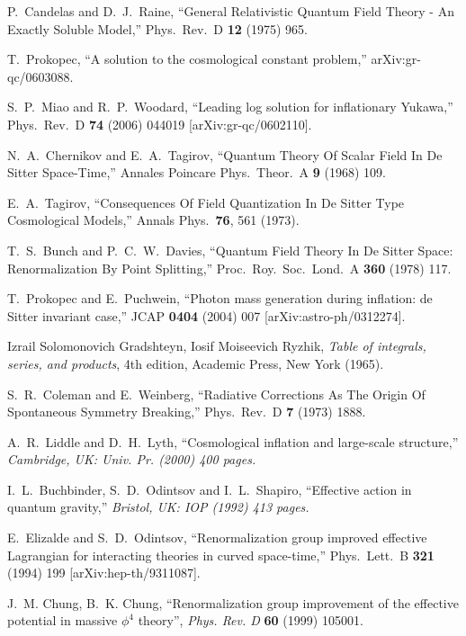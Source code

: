 \documentclass[aps,12pt,superscriptaddress,preprintnumbers,
                secnumarabic,nofootinbib,showpacs]{revtex4}
\begin{document}
\begin{thebibliography}{999}
  P.~Candelas and D.~J.~Raine,
  ``General Relativistic Quantum Field Theory - An Exactly Soluble Model,''
  Phys.\ Rev.\ D {\bf 12} (1975) 965.

  T.~Prokopec,
  ``A solution to the cosmological constant problem,''
  arXiv:gr-qc/0603088.

  S.~P.~Miao and R.~P.~Woodard,
  ``Leading log solution for inflationary Yukawa,''
  Phys.\ Rev.\  D {\bf 74} (2006) 044019
  [arXiv:gr-qc/0602110].

 N.~A.~Chernikov and E.~A.~Tagirov,
``Quantum Theory Of Scalar Field In De Sitter Space-Time,''
Annales Poincare Phys.\ Theor.\ A {\bf 9} (1968) 109.

E.~A.~Tagirov, ``Consequences Of Field Quantization In De Sitter
Type Cosmological Models,'' Annals Phys.\  {\bf 76}, 561 (1973).

T.~S.~Bunch and P.~C.~W.~Davies, ``Quantum Field Theory In De
Sitter Space: Renormalization By Point Splitting,'' Proc.\ Roy.\
Soc.\ Lond.\ A {\bf 360} (1978) 117.

  T.~Prokopec and E.~Puchwein,
  ``Photon mass generation during inflation: de Sitter invariant case,''
  JCAP {\bf 0404} (2004) 007
  [arXiv:astro-ph/0312274].

Izrail Solomonovich Gradshteyn, Iosif Moiseevich Ryzhik,
{\it Table of integrals, series, and products}, 4th edition,
Academic Press, New York (1965).

 S.~R.~Coleman and E.~Weinberg,
``Radiative Corrections As The Origin Of Spontaneous Symmetry
Breaking,'' Phys.\ Rev.\ D {\bf 7} (1973) 1888.

  A.~R.~Liddle and D.~H.~Lyth,
  ``Cosmological inflation and large-scale structure,''
{\it  Cambridge, UK: Univ. Pr. (2000) 400 pages.}

  I.~L.~Buchbinder, S.~D.~Odintsov and I.~L.~Shapiro,
  ``Effective action in quantum gravity,''
{\it  Bristol, UK: IOP (1992) 413 pages.}

  E.~Elizalde and S.~D.~Odintsov,
  ``Renormalization group improved effective Lagrangian for interacting
  theories in curved space-time,''
  Phys.\ Lett.\  B {\bf 321} (1994) 199
  [arXiv:hep-th/9311087].

 J.~M. Chung, B.~K. Chung,
 ``Renormalization group improvement of the effective potential
 in massive $\phi^4$ theory'', \textit{Phys. Rev. D} \textbf{60} (1999) 105001.


\end{thebibliography}
\end{document}
